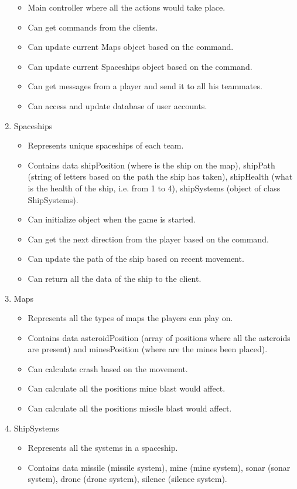 \begin{enumerate}
\begin{itemize}
\item Main controller where all the actions would take place.
\item Can get commands from the clients.
\item Can update current Maps object based on the command.
\item Can update current Spaceships object based on the command.
\item Can get messages from a player and send it to all his teammates.
\item Can access and update database of user accounts.
\end{itemize}
\item Spaceships
\begin{itemize}
\item Represents unique spaceships of each team.
\item Contains data shipPosition (where is the ship on the map), shipPath (string of letters based on the path the ship has taken), shipHealth (what is the health of the ship, i.e. from 1 to 4), shipSystems (object of class ShipSystems).
\item Can initialize object when the game is started.
\item Can get the next direction from the player based on the command.
\item Can update the path of the ship based on recent movement.
\item Can return all the data of the ship to the client.
\end{itemize}
\item Maps
\begin{itemize}
\item Represents all the types of maps the players can play on.
\item Contains data asteroidPosition (array of positions where all the asteroids are present) and minesPosition (where are the mines been placed).
\item Can calculate crash based on the movement.
\item Can calculate all the positions mine blast would affect.
\item Can calculate all the positions missile blast would affect.
\end{itemize}
\item ShipSystems
\begin{itemize}
\item Represents all the systems in a spaceship.
\item Contains data missile (missile system), mine (mine system), sonar (sonar system), drone (drone system), silence (silence system).

\end{itemize}
\end{enumerate}

